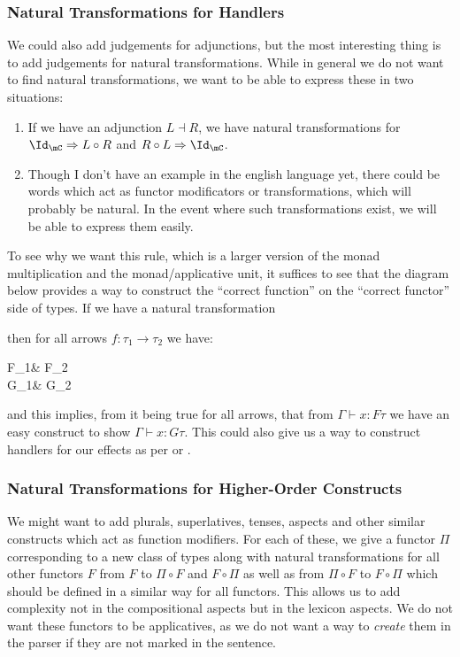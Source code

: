 \documentclass[math, english, info]{cours}
\def\cont{\Gamma\vdash}
\begin{document}
\subsubsection{Natural Transformations for Handlers}\label{subsubsec:handlers}
We could also add judgements for adjunctions, but the most interesting thing is to add judgements for natural transformations.
While in general we do not want to find natural transformations, we want to be able to express these in two situations:
\begin{enumerate}
	\item If we have an adjunction $L\dashv R$, we have natural transformations for $\Id_{\mC} \Rightarrow L \circ R$ and $R\circ L \Rightarrow \Id_{\mC}$.
	\item Though I don't have an example in the english language yet, there could be words which act as functor modificators or transformations, which will probably be natural.
		In the event where such transformations exist, we will be able to express them easily.
\end{enumerate}
To see why we want this rule, which is a larger version of the monad multiplication and the monad/applicative unit, it suffices to see that the diagram below provides a way to construct the ``correct function'' on the ``correct functor'' side of types. If we have a natural transformation  then for all arrows $f: \tau_{1} \to \tau_{2}$ we have:
\begin{category}
	F\tau_{1}\ar[r, "Ff"] & F\tau_{2}\\
	G\tau_{1}\ar[r, "Gf"] & G\tau_{2}
\end{category}
and this implies, from it being true for all arrows, that from $\cont x: F\tau$ we have an easy construct to show $\cont x: G\tau$.
This could also give us a way to construct handlers for our effects as per  or .

\subsubsection{Natural Transformations for Higher-Order Constructs}\label{subsubsec:higherorder}
We might want to add plurals, superlatives, tenses, aspects and other similar constructs which act as function modifiers.
For each of these, we give a functor $\Pi$ corresponding to a new class of types along with natural transformations for all other functors $F$ from $F$ to $\Pi \circ F$ and $F\circ \Pi$ as well as from $\Pi \circ F$ to $F\circ \Pi$ which should be defined in a similar way for all functors.
This allows us to add complexity not in the compositional aspects but in the lexicon aspects.
We do not want these functors to be applicatives, as we do not want a way to \emph{create} them in the parser if they are not marked in the sentence.
\end{document}
